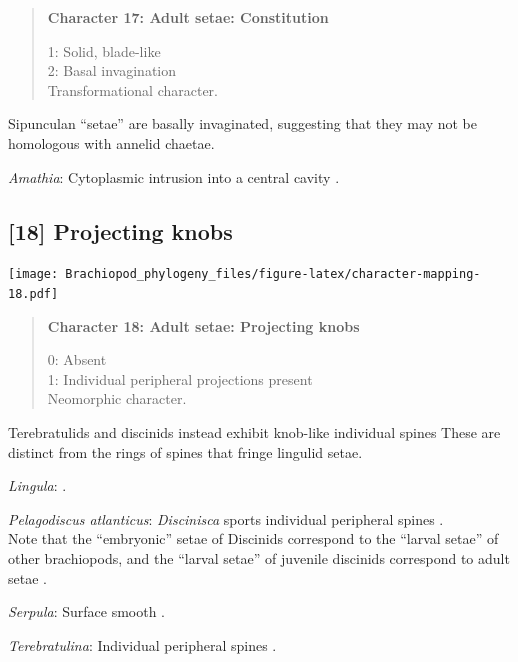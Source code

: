 \documentclass[openany]{book}
\begin{document}
\begin{quote}
\textbf{Character 17: Adult setae: Constitution}

1: Solid, blade-like\\
2: Basal invagination\\
Transformational character.
\end{quote}

Sipunculan ``setae'' are basally invaginated, suggesting that they may
not be homologous with annelid chaetae.

\hypertarget{Amathia-coding-17}{}
\emph{Amathia}: Cytoplasmic intrusion into a central cavity
\citep{Gordon1975}.

\subsection*{{[}18{]} Projecting knobs}\label{projecting-knobs}

\texttt{[image: Brachiopod\_phylogeny\_files/figure-latex/character-mapping-18.pdf]}

\begin{quote}
\textbf{Character 18: Adult setae: Projecting knobs}

0: Absent\\
1: Individual peripheral projections present\\
Neomorphic character.
\end{quote}

Terebratulids and discinids instead exhibit knob-like individual spines
These are distinct from the rings of spines that fringe lingulid setae.

\hypertarget{Lingula-coding-18}{}
\emph{Lingula}: \citet{Luter2000}.

\hypertarget{Pelagodiscus_atlanticus-coding-18}{}
\emph{Pelagodiscus atlanticus}: \emph{Discinisca} sports individual
peripheral spines \citep{Williams1997Introduction, Luter2003}.\\
Note that the ``embryonic'' setae of Discinids correspond to the
``larval setae'' of other brachiopods, and the ``larval setae'' of
juvenile discinids correspond to adult setae \citep{Luter2003}.

\hypertarget{Serpula-coding-18}{}
\emph{Serpula}: Surface smooth \citep{Sun2012}.

\hypertarget{Terebratulina-coding-18}{}
\emph{Terebratulina}: Individual peripheral spines \citep[in
\emph{Calloria};][]{Luter2000}.
\end{document}
